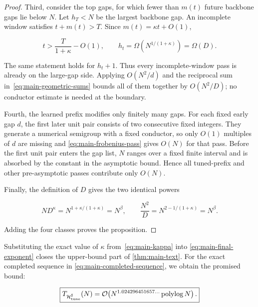 \begin{proof}
  Third, consider the top gaps, for which fewer than $m(t)$ future backbone
  gaps lie below $N$.  Let $h_T<N$ be the largest backbone gap.  An incomplete
  window satisfies $t+m(t)>T$.  Since $m(t)=\kappa t+O(1)$,

  \begin{equation}
    t>\frac{T}{1+\kappa}-O(1),
    \qquad
    h_t=\Omega\!\left(N^{1/(1+\kappa)}\right)=\Omega(D).
    \label{eq:main-top-scale}
  \end{equation}

  The same statement holds for $h_t+1$.  Thus every incomplete-window pass is
  already on the large-gap side.  Applying $O(N^2/d)$ and the reciprocal sum
  in~\eqref{eq:main-geometric-sums} bounds all of them together by
  $O(N^2/D)$; no conductor estimate is needed at the boundary.

  Fourth, the learned prefix modifies only finitely many gaps.  For each fixed
  early gap $d$, the first later unit pair consists of two consecutive fixed
  integers.  They generate a numerical semigroup with a fixed conductor, so
  only $O(1)$ multiples of $d$ are missing and
  \eqref{eq:main-frobenius-pass} gives $O(N)$ for that pass.  Before the first
  unit pair enters the gap list, $N$ ranges over a fixed finite interval and is
  absorbed by the constant in the asymptotic bound.  Hence all tuned-prefix and
  other pre-asymptotic passes contribute only $O(N)$.

  Finally, the definition of $D$ gives the two identical powers

  \begin{equation}
    ND^\kappa
      =N^{1+\kappa/(1+\kappa)}=N^\beta,
    \qquad
    \frac{N^2}{D}
      =N^{2-1/(1+\kappa)}=N^\beta.
    \label{eq:main-two-sides-meet}
  \end{equation}

  Adding the four classes proves the proposition.
\end{proof}

Substituting the exact value of $\kappa$ from~\eqref{eq:main-kappa} into
\eqref{eq:main-final-exponent} closes the upper-bound part of
\cref{thm:main-text}.  For the exact completed sequence in
\eqref{eq:main-completed-sequence}, we obtain the promised bound:

\begin{equation}
  \boxed{
  T_{\mathcal H^\sharp_{\rm tune}}(N)
  =\mathcal{O}\!\left(
    N^{1.024296451657\ldots}\operatorname{polylog} N
  \right).}
  \label{eq:main-boxed-bound}
\end{equation}

